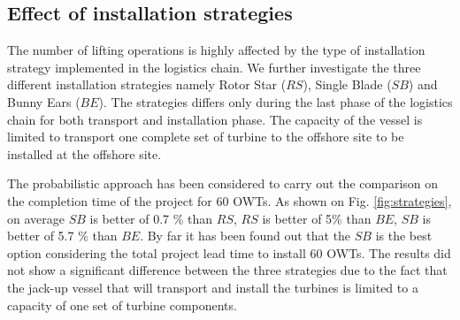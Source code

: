 \subsection{Effect of installation strategies}
The number of lifting operations is highly affected by the type of installation strategy implemented in the logistics chain. We further investigate the three different installation strategies namely Rotor Star ($RS$), Single Blade ($SB$) and Bunny Ears ($BE$). The strategies differs only during the last phase of the logistics chain for both transport and installation phase. The capacity of the vessel is limited to transport one complete set of turbine to the offshore site to be installed at the offshore site.

The probabilistic approach has been considered to carry out the comparison on the completion time of the project for 60 OWTs. As shown on Fig. \ref{fig:strategies}, on average $SB$ is better of 0.7 \% than $RS$, $RS$ is better of 5\% than $BE$, $SB$ is better of 5.7 \% than $BE$. By far it has been found out that the $SB$ is the best option considering the total project lead time to install 60 OWTs. The results did not show a significant difference between the three strategies due to the fact that the jack-up vessel that will transport and install the turbines is limited to a capacity of one set of turbine components. 